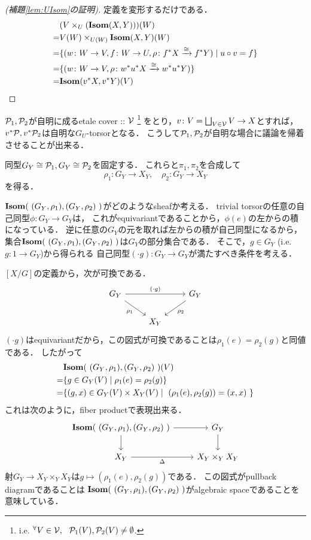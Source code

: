 \begin{proof}[(補題\ref{lem:UIsom}の証明)]
    定義を変形するだけである．
    \begin{align*}
        {}& (V \times_{U} (\mathbf{Isom}(X, Y)))(W) \\
        =&  V(W) \times_{U(W)} \mathbf{Isom}(X, Y)(W) \\
        =&  \{ (w \colon W \to V, f \colon W \to U, \rho \colon f^*X \xrightarrow{\cong} f^*Y) \mid u \circ v=f \} \\
        =&  \{ (w \colon W \to V, \rho \colon w^* u^*X \xrightarrow{\cong} w^* u^*Y) \} \\
        =&  \mathbf{Isom}(v^*X, v^*Y)(V)
    \end{align*}
\end{proof}

$\mathcal{P}_1, \mathcal{P}_2$が自明に成るetale cover :: $\mathcal{V}$
\footnote{ i.e. ${}^{\forall} V \in \mathcal{V},~~ \mathcal{P}_1(V), \mathcal{P}_2(V) \neq \emptyset$. }
をとり，$v \colon V=\bigsqcup_{V \in \mathcal{V}} V \to X$とすれば，
$v^*\mathcal{P}, v^*\mathcal{P}_2$は自明な$G_U$-torsorとなる．
こうして$\mathcal{P}_1, \mathcal{P}_2$が自明な場合に議論を帰着させることが出来る．

同型$G_Y \cong \mathcal{P}_1, G_Y \cong \mathcal{P}_2$を固定する．
これらと$\pi_1, \pi_2$を合成して
\[ \rho_1 \colon G_Y \to X_Y, \quad \rho_2 \colon G_Y \to X_Y \]を得る．


$\Isom(\ (G_Y, \rho_1), (G_Y, \rho_2)\ )$がどのようなsheafか考える．
trivial torsorの任意の自己同型$\phi \colon G_Y \to G_Y$は，
これがequivariantであることから，$\phi(e)$の左からの積になっている．
逆に任意の$G_Y$の元を取れば左からの積が自己同型になるから，
集合$\Isom(\ (G_Y, \rho_1), (G_Y, \rho_2)\ )$は$G_Y$の部分集合である．
そこで，$g \in G_Y$ (i.e. $g \colon 1 \to G_Y$)から得られる
自己同型$(\cdot g) \colon G_Y \to G_Y$が満たすべき条件を考える．

$[X/G]$の定義から，次が可換である．
\[
\begin{tikzcd}
    G_Y \ar[rr, "(\cdot g)"]\ar[rd, "\rho_1"']& {} & G_Y \ar[ld, "\rho_2"]\\
    {} & X_Y & {}
\end{tikzcd}
\]
$(\cdot g)$はequivariantだから，この図式が可換であることは$\rho_1(e)=\rho_2(g)$と同値である．
したがって
\begin{align*}
    {}& \Isom(\ (G_Y, \rho_1), (G_Y, \rho_2)\ )(V) \\
    =&  \{ g \in G_Y(V) \mid \rho_1(e)=\rho_2(g) \} \\
    =&  \{ (g, x) \in G_Y(V) \times X_Y(V) \mid  (\rho_1(e), \rho_2(g))=(x, x)  \}
\end{align*}
これは次のように，fiber productで表現出来る．
\[
\begin{tikzcd}
    \Isom(\ (G_Y, \rho_1), (G_Y, \rho_2)\ ) \ar[r]\ar[d]& G_Y \ar[d]\\
    X_Y \ar[r, "\Diag"']& X_Y \times_{Y} X_Y
\end{tikzcd}
\]
射$G_Y \to X_Y \times_{Y} X_Y$は$g \mapsto (\rho_1(e), \rho_2(g))$である．
この図式がpullback diagramであることは
$\Isom(\ (G_Y, \rho_1), (G_Y, \rho_2)\ )$がalgebraic spaceであることを意味している．

